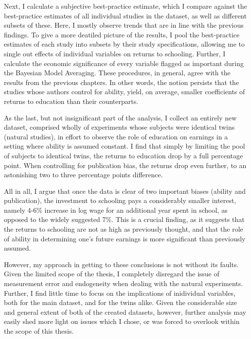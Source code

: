 Next, I calculate a subjective best-practice estimate, which I compare against the best-practice estimates of all individual studies in the dataset, as well as different subsets of these. Here, I mostly observe trends that are in line with the previous findings. To give a more deatiled picture of the results, I pool the best-practice estimates of each study into subsets by their study specifications, allowing me to single out effects of individual variables on returns to schooling. Further, I calculate the economic significance of every variable flagged as important during the Bayesian Model Averaging. These procedures, in general, agree with the results from the previous chapters. In other words, the notion persists that the studies whose authors control for ability, yield, on average, smaller coefficients of returns to education than their counterparts.

As the last, but not insignificant part of the analysis, I collect an entirely new dataset, comprised wholly of experiments whose subjects were identical twins (natural studies), in effort to observe the role of education on earnings in a setting where ability is assumed constant. I find that simply by limiting the pool of subjects to identical twins, the returns to education drop by a full percentage point. When controlling for publication bias, the returns drop even further, to an astonishing two to three percentage points difference.

All in all, I argue that once the data is clear of two important biases (ability and publication), the investment to schooling pays a considerably smaller interest, namely 4-6\% increase in log wage for an additional year spent in school, as opposed to the widely suggested 7\%. This is a crucial finding, as it suggests that the returns to schooling are not as high as previously thought, and that the role of ability in determining one's future earnings is more significant than previously assumed.


However, my approach in getting to these conclusions is not without its faults. Given the limited scope of the thesis, I completely disregard the issue of measurement error and endogeneity when dealing with the natural experiments. Further, I find little time to focus on the implications of inidividual variables, both for the main dataset, and for the twins alike. Given the considerable size and general extent of both of the created datasets, however, further analysis may easily shed more light on issues which I chose, or was forced to overlook within the scope of this thesis.

